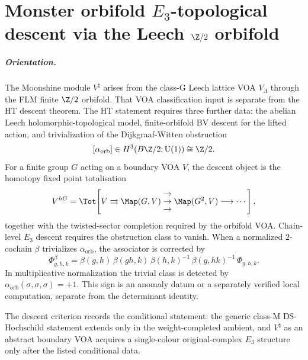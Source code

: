 %

\chapter[Monster orbifold E\_3 descent]{Monster orbifold
$E_3$-topological descent via the Leech $\Z/2$ orbifold}
\label{ch:monster-chain-level-e3-top-platonic}

\paragraph{Orientation.}
The Moonshine module $V^\natural$ arises from the class-G Leech
lattice VOA $V_\Lambda$ through the FLM finite $\Z/2$ orbifold. That VOA
classification input is separate from the HT descent theorem. The HT statement
requires three further data: the abelian Leech holomorphic-topological
model, finite-orbifold BV descent for the lifted action, and
trivialization of the Dijkgraaf-Witten obstruction
\[
 [\alpha_{\mathrm{orb}}]\in H^3(B\Z/2;\mathrm{U}(1))\cong \Z/2.
\]
For a finite group $G$ acting on a boundary VOA $V$, the descent object
is the homotopy fixed point totalisation
\[
 V^{hG}
 =
 \Tot\!\left[
 V \rightrightarrows \Map(G,V)
 \;\begin{matrix}\to\\[-0.65ex]\to\\[-0.65ex]\to\end{matrix}\;
 \Map(G^2,V)
 \longrightarrow \cdots
 \right],
\]
together with the twisted-sector completion required by the orbifold
VOA. Chain-level $E_3$ descent requires the obstruction class to vanish.
When a normalized $2$-cochain $\beta$ trivializes
$\alpha_{\mathrm{orb}}$, the associator is corrected by
\[
 \Phi^\beta_{g,h,k}
 =
 \beta(g,h)\,\beta(gh,k)\,\beta(h,k)^{-1}\,
 \beta(g,hk)^{-1}\,\Phi_{g,h,k}.
\]
In multiplicative normalization the trivial class is detected by
$\alpha_{\mathrm{orb}}(\sigma,\sigma,\sigma)=+1$. This sign is an
anomaly datum or a separately verified local computation, separate
from the determinant identity.

The descent criterion records the conditional statement: the
generic class-M DS-Hochschild statement extends only in the
weight-completed ambient, and $V^\natural$ as
an abstract boundary VOA acquires a single-colour
original-complex $E_3$ structure only after the listed conditional data.

